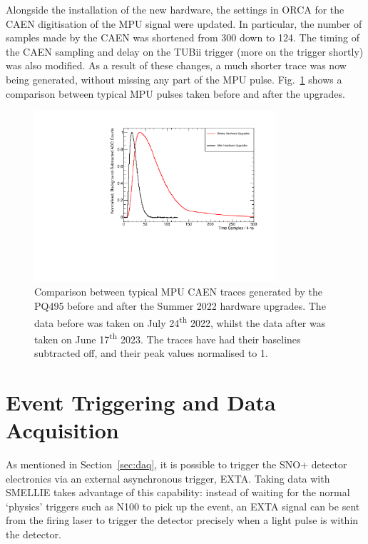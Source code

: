 Alongside the installation of the new hardware, the settings in ORCA for the CAEN digitisation of the MPU signal were updated. In particular, the number of samples made by the CAEN was shortened from 300 down to 124. The timing of the CAEN sampling and delay on the TUBii trigger (more on the trigger shortly) was also modified. As a result of these changes, a much shorter trace was now being generated, without missing any part of the MPU pulse. Fig.~\ref{fig:caen_trace_comparison} shows a comparison between typical MPU pulses taken before and after the upgrades.

\begin{figure}
    \centering
    \includegraphics[width=0.8\textwidth]{3_SMELLIEHardware/images/caen_traces_comparison_plot.pdf}
    \caption[Comparison between typical MPU CAEN traces generated by the PQ495 before and after the Summer 2022 hardware upgrades]
    {Comparison between typical MPU CAEN traces generated by the PQ495 before and after the Summer 2022 hardware upgrades. The data before was taken on July 24\textsuperscript{th} 2022, whilst the data after was taken on June 17\textsuperscript{th} 2023. The traces have had their baselines subtracted off, and their peak values normalised to 1.}
    \label{fig:caen_trace_comparison}
\end{figure}

\section{Event Triggering and Data Acquisition}\label{sec:smellie_triggering_daq}
As mentioned in Section~\ref{sec:daq}, it is possible to trigger the SNO+ detector electronics via an external asynchronous trigger, EXTA. Taking data with SMELLIE takes advantage of this capability: instead of waiting for the normal `physics' triggers such as N100 to pick up the event, an EXTA signal can be sent from the firing laser to trigger the detector precisely when a light pulse is within the detector.


